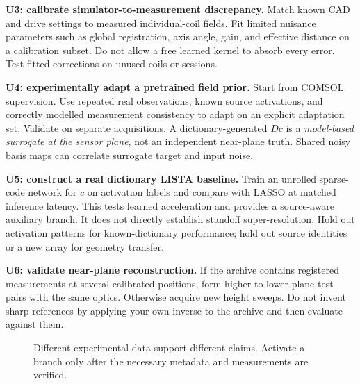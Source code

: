 \textbf{U3: calibrate simulator-to-measurement discrepancy.} Match known CAD and drive settings to measured individual-coil fields. Fit limited nuisance parameters such as global registration, axis angle, gain, and effective distance on a calibration subset. Do not allow a free learned kernel to absorb every error. Test fitted corrections on unused coils or sessions.

\textbf{U4: experimentally adapt a pretrained field prior.} Start from COMSOL supervision. Use repeated real observations, known source activations, and correctly modelled measurement consistency to adapt on an explicit adaptation set. Validate on separate acquisitions. A dictionary-generated $D c$ is a \emph{model-based surrogate at the sensor plane}, not an independent near-plane truth. Shared noisy basis maps can correlate surrogate target and input noise.

\textbf{U5: construct a real dictionary LISTA baseline.} Train an unrolled sparse-code network for $c$ on activation labels and compare with LASSO at matched inference latency. This tests learned acceleration and provides a source-aware auxiliary branch. It does not directly establish standoff super-resolution. Hold out activation patterns for known-dictionary performance; hold out source identities or a new array for geometry transfer.

\textbf{U6: validate near-plane reconstruction.} If the archive contains registered measurements at several calibrated positions, form higher-to-lower-plane test pairs with the same optics. Otherwise acquire new height sweeps. Do not invent sharp references by applying your own inverse to the archive and then evaluate against them.

\begin{figure}[htbp]\centering
{}
\caption{Different experimental data support different claims. Activate a branch only after the necessary metadata and measurements are verified.}
\end{figure}

